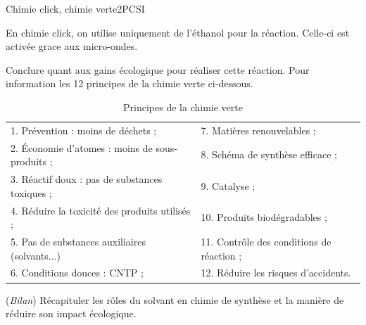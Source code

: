 \begin{exercise}{Chimie click, chimie verte}{2}{PCSI}
\begin{questions}
    \question En chimie click, on utilise uniquement de l'éthanol pour la réaction. Celle-ci est activée grace aux micro-ondes.
    
    
    \question Conclure quant aux gains écologique pour réaliser cette réaction. Pour information les 12 principes de la chimie verte ci-dessous.
    
    \begin{table}[H]
        \centering
        \begin{tabular}{ll}
            \\\hline\hline
            1. Prévention : moins de déchets ; &
            7. Matières renouvelables  ;\\
            2. Économie d'atomes : moins de sous-produits ; &
            8. Schéma de synthèse efficace ;\\
            3. Réactif doux : pas de substances toxiques ; &
            9. Catalyse ;\\
            4. Réduire la toxicité des produits utilisés ; &
            10. Produits biodégradables ;\\
            5. Pas de substances auxiliaires (solvants...) &
            11. Contrôle des conditions de réaction ; \\
            6. Conditions douces : CNTP ; &
            12. Réduire les risques d'accidents. \\ \hline
        \end{tabular}
        \caption{Principes de la chimie verte}
    \end{table}
    
    \question (\emph{Bilan}) Récapituler les rôles du solvant en chimie de synthèse et la manière de réduire son impact écologique.
\end{questions}
\end{exercise}